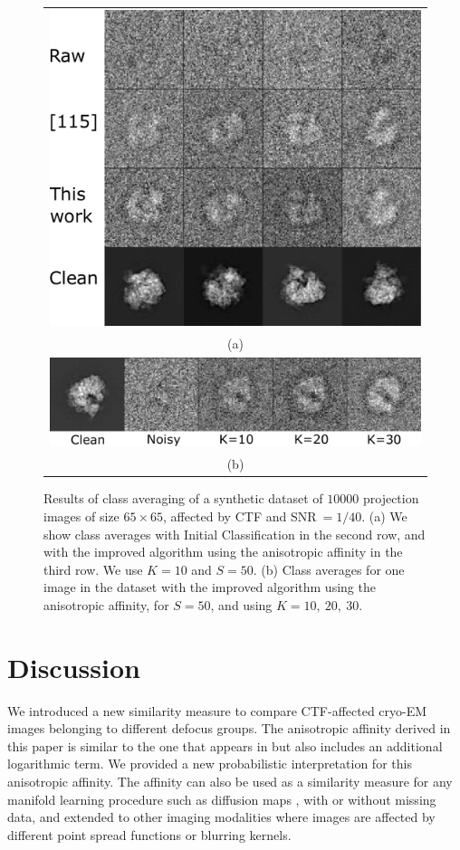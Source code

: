 \begin{figure}[!htbp]
\begin{center}
\begin{tabular}{c}
\includegraphics[width=.9 \columnwidth]{figures/classavg_mah_K10_2.pdf}\\
(a)\\
\includegraphics[width=.9 \columnwidth]{figures/classavg_fig3.pdf}\\
(b)
\end{tabular}
\end{center}

\caption{Results of class averaging of a synthetic dataset of $10000$ projection images of size $65 \times 65$, affected by CTF and SNR$\ =1/40$. (a) We show class averages with Initial Classification in the second row, and with the improved algorithm using the anisotropic affinity in the third row. We use $K=10$ and $S=50$. (b) Class averages for one image in the dataset with the improved algorithm using the anisotropic affinity, for $S=50$, and using $K=10,\ 20,\ 30$.}

\label{fig:classavg}
\end{figure}


\section{Discussion}
We introduced a new similarity measure to compare CTF-affected cryo-EM images belonging to different defocus groups.  The anisotropic affinity derived in this paper is similar to the one that appears in \cite{nlica, intgeom} but also includes an additional logarithmic term. We provided a new probabilistic interpretation for this anisotropic affinity. The affinity can also be used as a similarity measure for any manifold learning procedure \cite{intgeom, nlica} such as diffusion maps \cite{vdm, difmap}, with or without missing data, and extended to other imaging modalities where images are affected by different point spread functions or blurring kernels.
